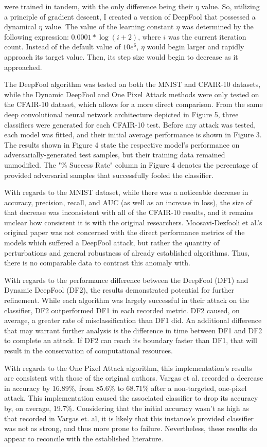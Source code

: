 \documentclass[../article.tex]{subfiles}
\begin{document}
\noindent were trained in tandem, with the only difference being their $\eta$ value. So, utilizing a principle of gradient descent, I created a version of DeepFool that possessed a dynamical $\eta$ value. The value of the learning constant $\eta$ was determined by the following expression: $0.0001 * \log(i + 2)$, where $i$ was the current iteration count. Instead of the default value of $10e^6$, $\eta$ would begin larger and rapidly approach its target value. Then, its step size would begin to decrease as it approached.

The DeepFool algorithm was tested on both the MNIST and CFAIR-10 datasets, while the Dynamic DeepFool and One Pixel Attack methods were only tested on the CFAIR-10 dataset, which allows for a more direct comparison. From the same deep convolutional neural network architecture depicted in Figure 5, three classifiers were generated for each CFAIR-10 test. Before any attack was tested, each model was fitted, and their initial average performance is shown in Figure 3. The results shown in Figure 4 state the respective model's performance on adversarially-generated test samples, but their training data remained unmodified. The "\% Success Rate" column in Figure 4 denotes the percentage of provided adversarial samples that successfully fooled the classifier.

With regards to the MNIST dataset, while there was a noticeable decrease in accuracy, precision, recall, and AUC (as well as an increase in loss), the size of that decrease was inconsistent with all of the CFAIR-10 results, and it remains unclear how consistent it is with the original researchers. Moosavi-Dezfooli et al.'s original paper was not concerned with the direct performance metrics of the models which suffered a DeepFool attack, but rather the quantity of perturbations and general robustness of already established algorithms. Thus, there is no comparable data to contrast this anomaly with. 

With regards to the performance difference between the DeepFool (DF1) and Dynamic DeepFool (DF2), the results demonstrated potential for further refinement. While each algorithm was largely successful in their attack on the classifier, DF2 outperformed DF1 in each recorded metric. DF2 caused, on average, a greater rate of misclassification than DF1 did. An additional difference that may warrant further analysis is the difference in time between DF1 and DF2 to complete an attack. If DF2 can reach its boundary faster than DF1, that will result in the conservation of computational resources.

With regards to the One Pixel Attack algorithm, this implementation's results are consistent with those of the original authors. Vargas et al. recorded a decrease in accuracy by 16.89\%, from 85.6\% to 68.71\% after a non-targeted, one-pixel attack. This implementation caused the associated classifier to drop its accuracy by, on average, 19.7\%. Considering that the initial accuracy wasn't as high as that recorded in Vargas et. al, it is likely that this instance's provided classifier was not as strong, and thus more prone to failure. Nevertheless, these results do appear to reconcile with the established literature.


\printbibliography
\end{document}
